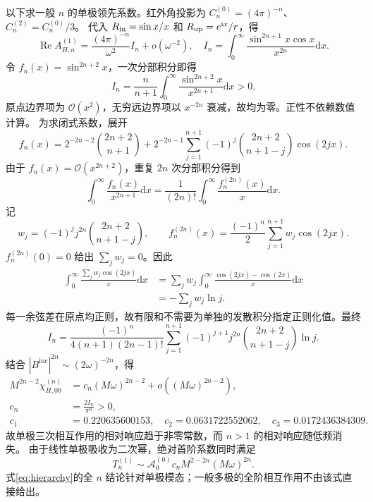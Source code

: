\documentclass[UTF8,fontset=fandol,11pt,a4paper]{ctexart}
\newcommand{\ii}{\mathrm i}
\newcommand{\dd}{\mathrm d}
\newcommand{\Rea}{\operatorname{Re}}
\newcommand{\Bin}{B^{\mathrm{inc}}}
\newcommand{\calO}{\mathcal O}
\numberwithin{equation}{section}
\begin{document}
以下求一般 $n$ 的单极领先系数。红外角投影为
$C_n^{(0)}=(4\pi)^{-n}$、$C_n^{(2)}=C_n^{(0)}/3$。
代入 $R_{\rm in}=\sin x/x$ 和 $R_{\rm up}=e^{\ii x}/r$，得
\begin{equation}
\Rea A_{H,n}^{(1)}=\frac{(4\pi)^{-n}}{\omega^2}I_n+o(\omega^{-2}),\quad
I_n=\int_0^\infty\frac{\sin^{2n+1}x\cos x}{x^{2n}}\dd x.
\end{equation}
令 $f_n(x)=\sin^{2n+2}x$，一次分部积分即得
\begin{equation}
I_n=\frac{n}{n+1}\int_0^\infty\frac{\sin^{2n+2}x}{x^{2n+1}}\dd x>0.\label{eq:positive}
\end{equation}
原点边界项为 $\calO(x^2)$，无穷远边界项以 $x^{-2n}$ 衰减，故均为零。正性不依赖数值计算。
为求闭式系数，展开
\begin{equation}
f_n(x)=2^{-2n-2}\binom{2n+2}{n+1}
+2^{-2n-1}\sum_{j=1}^{n+1}(-1)^j\binom{2n+2}{n+1-j}\cos(2jx).
\end{equation}
由于 $f_n(x)=\calO(x^{2n+2})$，重复 $2n$ 次分部积分得到
\begin{equation}
\int_0^\infty\frac{f_n(x)}{x^{2n+1}}\dd x
=\frac1{(2n)!}\int_0^\infty\frac{f_n^{(2n)}(x)}x\dd x.
\end{equation}
记
\begin{equation}
w_j=(-1)^j j^{2n}\binom{2n+2}{n+1-j},\qquad
f_n^{(2n)}(x)=\frac{(-1)^n}{2}\sum_{j=1}^{n+1}w_j\cos(2jx).
\end{equation}
$f_n^{(2n)}(0)=0$ 给出 $\sum_jw_j=0$。因此
\begin{align}
\int_0^\infty\frac{\sum_jw_j\cos(2jx)}x\dd x
&=\sum_jw_j\int_0^\infty\frac{\cos(2jx)-\cos(2x)}x\dd x\nonumber\\
&=-\sum_jw_j\ln j.
\end{align}
每一余弦差在原点均正则，故有限和不需要为单独的发散积分指定正则化值。最终
\begin{equation}
I_n=\frac{(-1)^n}{4(n+1)(2n-1)!}
\sum_{j=1}^{n+1}(-1)^{j+1}j^{2n}\binom{2n+2}{n+1-j}\ln j.
\end{equation}
结合 $|\Bin|^{2n}\sim(2\omega)^{-2n}$，得
\begin{align}
M^{2n-2}\chi_{H,00}^{(n)}&=c_n(M\omega)^{2n-2}+o((M\omega)^{2n-2}),\label{eq:hierarchy}\\
c_n&=\frac{2I_n}{\pi^n}>0,\\
c_1&=0.220635600153,\quad c_2=0.0631722552062,\quad c_3=0.0172436384309.
\end{align}
故单极三次相互作用的相对响应趋于非零常数，而 $n>1$ 的相对响应随低频消失。
由于线性单极吸收为二次幂，绝对首阶系数同时满足
\begin{equation}
T_n^{(1)}\sim\mathcal A_0^{(0)}c_n M^{2-2n}(M\omega)^{2n}.
\end{equation}
式\eqref{eq:hierarchy}的全 $n$ 结论针对单极模态；一般多极的全阶相互作用不由该式直接给出。
\end{document}
